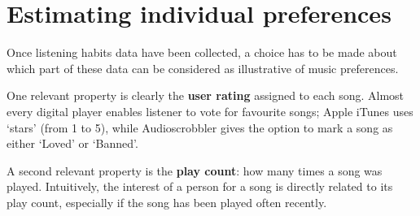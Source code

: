 % 
% 
% 
% 

\section{Estimating individual preferences} %
\label{sec:estimating_individual_preferences}

Once listening habits data have been collected, a choice has to be made about which part of these data can be considered as illustrative of music preferences.

One relevant property is clearly the \textbf{user rating} assigned to each song. 
Almost every digital player enables listener to vote for favourite songs; Apple iTunes uses `stars' (from 1 to 5), while Audioscrobbler gives the option to mark a song as either `Loved' or `Banned'.

A second relevant property is the \textbf{play count}: how many times a song was played. Intuitively, the interest of a person for a song is directly related to its play count, especially if the song has been played often recently.


